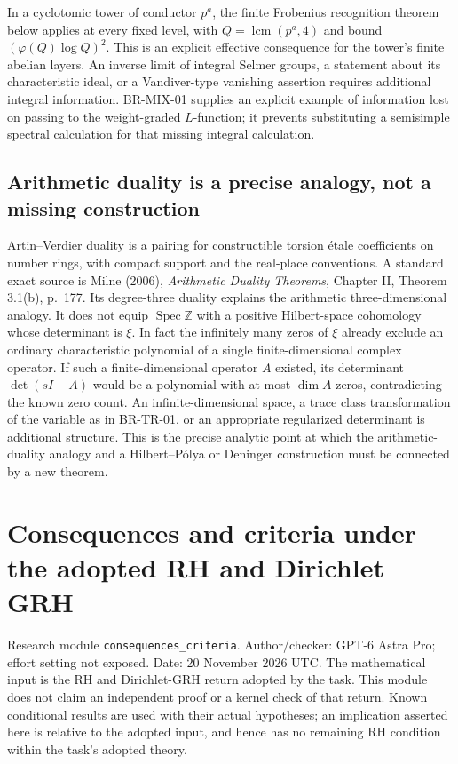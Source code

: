 \documentclass[11pt,a4paper]{article}
\theoremstyle{definition}\newtheorem{definition}[theorem]{Definition}
\theoremstyle{remark}\newtheorem{remark}[theorem]{Remark}
\begin{document}
In a cyclotomic tower of conductor $p^a$, the finite Frobenius
recognition theorem below applies at every fixed level, with
$Q=\operatorname{lcm}(p^a,4)$ and bound
$(\varphi(Q)\log Q)^2$.  This is an explicit effective
consequence for the tower's finite abelian layers.  An inverse
limit of integral Selmer groups, a statement about its
characteristic ideal, or a Vandiver-type vanishing assertion
requires additional integral information.  BR-MIX-01 supplies
an explicit example of information lost on passing to the
weight-graded $L$-function; it prevents substituting a
semisimple spectral calculation for that missing integral
calculation.

\subsection{Arithmetic duality is a precise analogy, not a missing construction}

Artin--Verdier duality is a pairing for constructible torsion
\'etale coefficients on number rings, with compact support and
the real-place conventions.  A standard exact source is Milne
(2006), \emph{Arithmetic Duality Theorems}, Chapter II,
Theorem 3.1(b), p.~177.  Its degree-three duality explains the arithmetic
three-dimensional analogy.  It does not equip
$\operatorname{Spec}\mathbb Z$ with a positive Hilbert-space
cohomology whose determinant is $\xi$.  In fact the infinitely
many zeros of $\xi$ already exclude an ordinary characteristic
polynomial of a single finite-dimensional complex operator.
If such a finite-dimensional operator $A$ existed, its
determinant $\det(sI-A)$ would be a polynomial with at most
$\dim A$ zeros, contradicting the known zero count.
An infinite-dimensional space, a trace class transformation
of the variable as in BR-TR-01, or an appropriate regularized
determinant is additional structure.  This is the precise
analytic point at which the arithmetic-duality analogy and a
Hilbert--P\'olya or Deninger construction must be connected by
a new theorem.



\section{Consequences and criteria under the adopted RH and Dirichlet
GRH}\label{consequences-and-criteria-under-the-adopted-rh-and-dirichlet-grh}

Research module \nolinkurl{consequences_criteria}. Author/checker: GPT-6
Astra Pro; effort setting not exposed. Date: 20 November 2026 UTC. The
mathematical input is the RH and Dirichlet-GRH return adopted by the
task. This module does not claim an independent proof or a kernel check
of that return. Known conditional results are used with their actual
hypotheses; an implication asserted here is relative to the adopted
input, and hence has no remaining RH condition within the task's adopted
theory.
\end{document}
